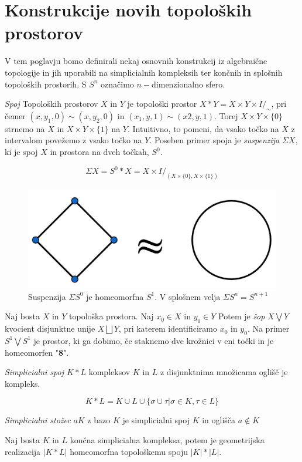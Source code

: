 \documentclass[mat1]{fmfdelo}
\begin{document}
\section{Konstrukcije novih topoloških prostorov}


V tem poglavju bomo definirali nekaj osnovnih konstrukcij iz algebraične topologije in jih uporabili na simplicialnih kompleksih ter končnih in splošnih topoloških prostorih. S $S^n$ označimo $n-$dimenzionalno sfero.

\textit{Spoj} Topoloških prostorov $X$ in $Y$ je topološki prostor $X\ast Y = X\times Y 
\times I /_{\sim}$, pri čemer $(x, y_1, 0) \sim (x, y_2, 0)$ in  $(x_1, y, 1) \sim (x2, y, 1)$. 
Torej $X\times Y\times \{0\}$ strnemo na $X$ in $X\times Y\times \{1\}$ na $Y$. Intuitivno, 
to pomeni, da vsako točko na $X$ z intervalom povežemo z vsako točko na $Y$.
Poseben primer spoja je \textit{suspenzija} $\Sigma X$, ki je spoj $X$ in prostora na dveh točkah, $S^0$.

$$
\Sigma X=S^0\ast X = X\times I /_{(X\times \{0\},X\times \{1\})}
$$

\begin{figure}[h]
    \centering
    \includegraphics[width=0.6\linewidth]{homeo2.png}
    \caption{Suspenzija $\Sigma S^0$ je homeomorfna $S^1$. V splošnem velja $\Sigma S^n=S^{n+1}$}
\end{figure}

Naj bosta $X$ in $Y$ topološka prostora. Naj $x_0\in X$ in $y_0\in Y$ Potem je 
\textit{šop} $X\bigvee Y$ kvocient disjunktne unije $X\bigsqcup Y$, pri
 katerem identificiramo $x_0$ in $y_0$. Na primer $S^1\bigvee S^1$ je prostor,
  ki ga dobimo, če staknemo dve krožnici v eni točki in je homeomorfen "\textbf{8}".


\textit{Simplicialni spoj $K\ast L$} kompleksov $K$ in $L$ z disjunktnima množicama oglišč je kompleks.

$$
K\ast L=K\cup L \cup \{\sigma \cup \tau| \sigma \in K, \tau \in L \}
$$

\textit{Simplicialni stožec} $aK$ z bazo $K$ je simplicialni spoj $K$ in oglišča $a\notin K$


\begin{trditev}
    Naj bosta $K$ in $L$ končna simplicialna kompleksa, potem je geometrijska realizacija $|K\ast L|$ homeomorfna topološkemu spoju $|K|\ast |L|$.
    \label{tr:spoj}
\end{trditev}
\end{document}
